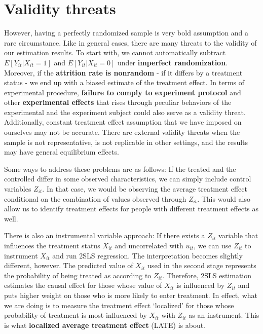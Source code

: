 \section{Validity threats}
However, having a perfectly randomized sample is very bold assumption and a rare circumstance. Like in general cases, there are many threats to the validity of our estimation results. To start with, we cannot automatically subtract $E[Y_{it}|X_{it}=1]$ and $E[Y_{it}|X_{it}=0]$ under \textbf{imperfect randomization}. Moreover, if the \textbf{attrition rate is nonrandom} - if it differs by a treatment status - we end up with a biased estimate of the treatment effect. In terms of experimental procedure, \textbf{failure to comply to experiment protocol} and other \textbf{experimental effects} that rises through peculiar behaviors of the experimental and the experiment subject could also serve as a validity threat. Additionally, constant treatment effect assumption that we have imposed on ourselves may not be accurate. There are external validity threats when the sample is not representative, is not replicable in other settings, and the results may have general equilibrium effects.
\par\medskip
Some ways to address these problems are as follows: If the treated and the controlled differ in some observed characteristics, we can simply include control variables $Z_{it}$.  In that case, we would be observing the average treatment effect conditional on the combination of values observed through $Z_{it}$. This would also allow us to identify treatment effects for people with different treatment effects as well. 
\par\medskip
There is also an instrumental variable approach: If there exists a $Z_{it}$ variable that influences the treatment status $X_{it}$ and uncorrelated with $u_{it}$, we can use $Z_{it}$ to instrument $X_{it}$ and run 2SLS regression. The interpretation becomes slightly different, however. The predicted value of $X_{it}$ used in the second stage represents the probability of being treated as according to $Z_{it}$. Therefore, 2SLS estimation estimates the causal effect for those whose value of $X_{it}$ is influenced by $Z_{it}$ and puts higher weight on those who is more likely to enter treatment. In effect, what we are doing is to measure the treatment effect `localized' for those whose probability of treatment is most influenced by $X_{it}$ with $Z_{it}$ as an instrument. This is what \textbf{localized average treatment effect} (LATE) is about.
\par\medskip
